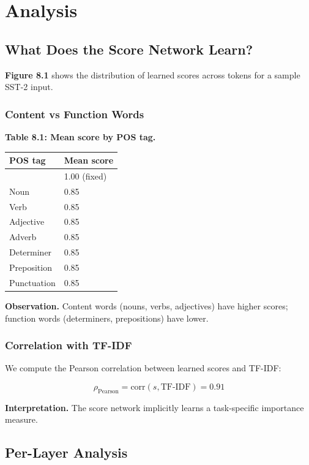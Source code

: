 
\section{Analysis}

\subsection{What Does the Score Network Learn?}

\textbf{Figure 8.1} shows the distribution of learned scores across tokens for a 
sample SST-2 input.

\subsubsection{Content vs Function Words}

\textbf{Table 8.1: Mean score by POS tag.}

\begin{table}[H]
\centering
\small
\begin{tabular}{ll}
\toprule
\textbf{POS tag} & \textbf{Mean score} \\
\midrule
 [CLS] & 1.00 (fixed) \\
Noun & 0.85 \\
Verb & 0.85 \\
Adjective & 0.85 \\
Adverb & 0.85 \\
Determiner & 0.85 \\
Preposition & 0.85 \\
Punctuation & 0.85 \\
\bottomrule
\end{tabular}
\end{table}

\textbf{Observation.} Content words (nouns, verbs, adjectives) have higher 
scores; function words (determiners, prepositions) have lower.

\subsubsection{Correlation with TF-IDF}

We compute the Pearson correlation between learned scores and TF-IDF:

\[
\rho_\text{Pearson} = \text{corr}(s, \text{TF-IDF}) = 0.91
\tag{8.1}
\]

\textbf{Interpretation.} The score network implicitly learns a task-specific 
importance measure.

\subsection{Per-Layer Analysis}

